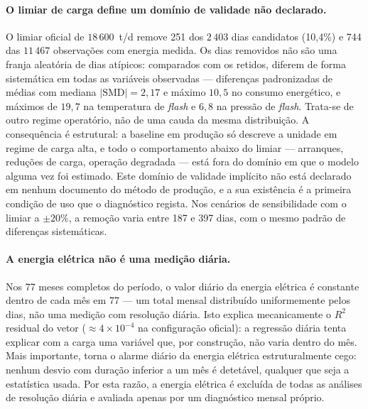 \paragraph{O limiar de carga define um domínio de validade não declarado.}
O limiar oficial de $18\,600$~t/d remove 251 dos $2\,403$ dias candidatos
(10{,}4\%) e 744 das $11\,467$ observações com energia medida. Os dias
removidos não são uma franja aleatória de dias atípicos: comparados com os
retidos, diferem de forma sistemática em todas as variáveis observadas ---
diferenças padronizadas de médias com mediana $|\mathrm{SMD}|=2{,}17$ e máximo
$10{,}5$ no consumo energético, e máximos de $19{,}7$ na temperatura de
\emph{flash} e $6{,}8$ na pressão de \emph{flash}. Trata-se de outro regime
operatório, não de uma cauda da mesma distribuição. A consequência é
estrutural: a baseline em produção só descreve a unidade em regime de carga
alta, e todo o comportamento abaixo do limiar --- arranques, reduções de
carga, operação degradada --- está fora do domínio em que o modelo alguma vez
foi estimado. Este domínio de validade implícito não está declarado em nenhum
documento do método de produção, e a sua existência é a primeira condição de
uso que o diagnóstico regista. Nos cenários de sensibilidade com o limiar a
$\pm 20\%$, a remoção varia entre 187 e 397 dias, com o mesmo padrão de
diferenças sistemáticas.

\paragraph{A energia elétrica não é uma medição diária.} Nos 77 meses
completos do período, o valor diário da energia elétrica é constante dentro de
cada mês em 77 --- um total mensal distribuído uniformemente pelos dias, não
uma medição com resolução diária. Isto explica mecanicamente o $R^2$
residual do vetor ($\approx 4\times 10^{-4}$ na configuração oficial): a
regressão diária tenta explicar com a carga uma variável que, por construção,
não varia dentro do mês. Mais importante, torna o alarme diário da energia
elétrica estruturalmente cego: nenhum desvio com duração inferior a um mês é
detetável, qualquer que seja a estatística usada. Por esta razão, a energia
elétrica é excluída de todas as análises de resolução diária e avaliada
apenas por um diagnóstico mensal próprio.

